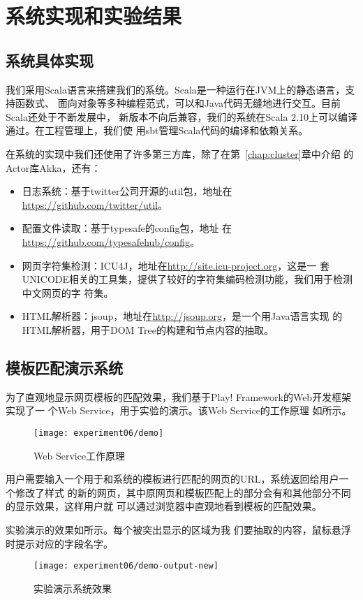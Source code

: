 
\chapter{系统实现和实验结果}
\label{chap:experiment}

\section{系统具体实现}
\label{sec:implementation}
我们采用Scala语言来搭建我们的系统。Scala是一种运行在JVM上的静态语言，支持函数式、
面向对象等多种编程范式，可以和Java代码无缝地进行交互。目前Scala还处于不断发展中，
新版本不向后兼容，我们的系统在Scala 2.10上可以编译通过。在工程管理上，我们使
用sbt管理Scala代码的编译和依赖关系。

在系统的实现中我们还使用了许多第三方库，除了在第~\ref{chap:cluster}章中介绍
的Actor库Akka，还有：
\begin{itemize}
\item 日志系统：基于twitter公司开源的util包，地址在
  \url{https://github.com/twitter/util}。
\item 配置文件读取：基于typesafe的config包，地址
  在\url{https://github.com/typesafehub/config}。
\item 网页字符集检测：ICU4J，地址在\url{http://site.icu-project.org}，这是一
  套UNICODE相关的工具集，提供了较好的字符集编码检测功能，我们用于检测中文网页的字
  符集。
\item HTML解析器：jsoup，地址在\url{http://jsoup.org}，是一个用Java语言实现
  的HTML解析器，用于DOM Tree的构建和节点内容的抽取。
\end{itemize}
\section{模板匹配演示系统}
\label{sec:demo}
为了直观地显示网页模板的匹配效果，我们基于Play! Framework的Web开发框架实现了一
个Web Service，用于实验的演示。该Web Service的工作原理
如所示。
\begin{figure}
  \centering
  \texttt{[image: experiment06/demo]}
  \caption{Web Service工作原理}
  \label{experiment:fig:demo}
\end{figure}

用户需要输入一个用于和系统的模板进行匹配的网页的URL，系统返回给用户一个修改了样式
的新的网页，其中原网页和模板匹配上的部分会有和其他部分不同的显示效果，这样用户就
可以通过浏览器中直观地看到模板的匹配效果。

实验演示的效果如所示。每个被突出显示的区域为我
们要抽取的内容，鼠标悬浮时提示对应的字段名字。
\begin{figure}[h]
  \centering
  \texttt{[image: experiment06/demo-output-new]}
  \caption{实验演示系统效果}
  \label{experiment:fig:demoresult}
\end{figure}

